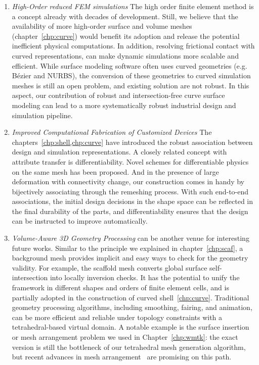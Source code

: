 \begin{enumerate}
\item \emph{High-Order reduced FEM simulations}
The high order finite element method is a concept already with decades of development. Still, we believe that the availability of more high-order surface and volume meshes (chapter~\ref{chp:curve}) would benefit its adoption and release the potential inefficient physical computations. In addition, resolving frictional contact with curved representations, \cite{ferguson2022high} can make dynamic simulations more scalable and efficient. 
While surface modeling software often uses curved geometries (e.g. B{\'e}zier and NURBS), the conversion of these geometries to curved simulation meshes is still an open problem, and existing solution are not robust. In this aspect, our contribution of robust and intersection-free curve surface modeling can lead to a more systematically robust industrial design and simulation pipeline.

\item \emph{Improved Computational Fabrication of Customized Devices}
The chapters~\ref{chp:shell,chp:curve} have introduced the robust association between design and simulation representations. A closely related concept with attribute transfer is differentiability. Novel schemes for differentiable physics on the same mesh has been proposed. And in the presence of large deformation with connectivity change, our construction comes in handy by bijectively associating through the remeshing process. 
With such end-to-end associations, the initial design decisions in the shape space can be reflected in the final durability of the parts, and differentiability ensures that the design can be instructed to improve automatically.  

\item \emph{Volume-Aware 3D Geometry Processing}
can be another venue for interesting future works. 
Similar to the principle we explained in chapter~\ref{chp:scaf}, a background mesh provides implicit and easy ways to check for the geometry validity. For example, the scaffold mesh converts global surface self-intersection into locally inversion checks. It has the potential to unify the framework in different shapes and orders of finite element cells, and is partially adopted in the construction of curved shell~\ref{chp:curve}. Traditional geometry processing algorithms, including smoothing, fairing, and animation, can be more efficient and reliable under topology constraints with a tetrahedral-based virtual domain. A notable example is the surface insertion or mesh arrangement problem we used in Chapter~\ref{chp:wmtk}: the exact version is still the bottleneck of our tetrahedral mesh generation algorithm, but recent advances in mesh arrangement~\cite{Hu:2019:fTetWild,zhou2016mesh,ember2022} are promising on this path.


\end{enumerate}
